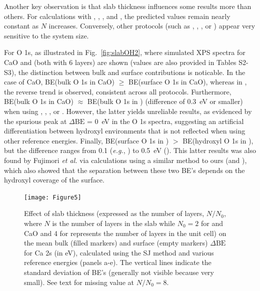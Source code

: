 \documentclass[journal=jpccck,manuscript=article]{achemso}
\def\dbe{\ensuremath{\Delta\text{BE}}}
\begin{document}
Another key observation is that slab thickness influences some results more than others. For calculations with , , , and , the predicted values remain nearly constant as $N$ increases. Conversely, other protocols (such as , , \cpx{\phi}, or ) appear very sensitive to the system size. 

For O 1s, as illustrated in Fig.~\ref{fig:slabOH2}, where simulated XPS spectra for CaO and  (both with 6 layers) are shown  (values are also provided in Tables S2-S3), the distinction between bulk and surface contributions is noticable. In the case of CaO, BE(bulk O 1s in CaO) $\geq$ BE(surface O 1s in CaO), whereas in , the reverse trend is observed, consistent across all protocols. Furthermore, BE(bulk O 1s in CaO) $\approx$ BE(bulk O 1s in ) (difference of \SI{0.3}{\electronvolt} or smaller) when using , , , or . However, the latter yields unreliable results, as evidenced by the spurious peak at \dbe{} = \SI{0}{\electronvolt} in the O 1s spectra, suggesting an artificial differentiation between hydroxyl environments that is not reflected when using other reference energies. Finally,  BE(surface O 1s in ) $>$ BE(hydroxyl O 1s  in ), but the difference ranges from 0.1 (\textit{e.g.}, ) to \SI{0.5}{\electronvolt} (). This latter results was also found by Fujimori \emph{et al.} \cite{fujimoriInteractionWaterCaO2016a} via calculations using a similar method to ours (and ), which also showed that the separation between these two BE's depends on the hydroxyl coverage of the surface.



\begin{figure}[p]
	\centering
	\texttt{[image: Figure5]}
	\caption{Effect of slab thickness (expressed as the number of layers, $N/N_0$, where $N$ is the number of layers in the slab while $N_0 = 2$ for  and CaO and 4 for  represents the number of layers in the unit cell)  on the mean bulk (filled markers) and surface (empty markers) \dbe{} for Ca 2s (in \si{\electronvolt}), calculated using the SJ method and various reference energies (panels a-e). The vertical lines indicate the standard deviation of BE's  (generally not visible because very small). See text for missing value at $N/N_0=8$.}
	\label{fig:slabsthicknessSJ}
\end{figure}
\end{document}
